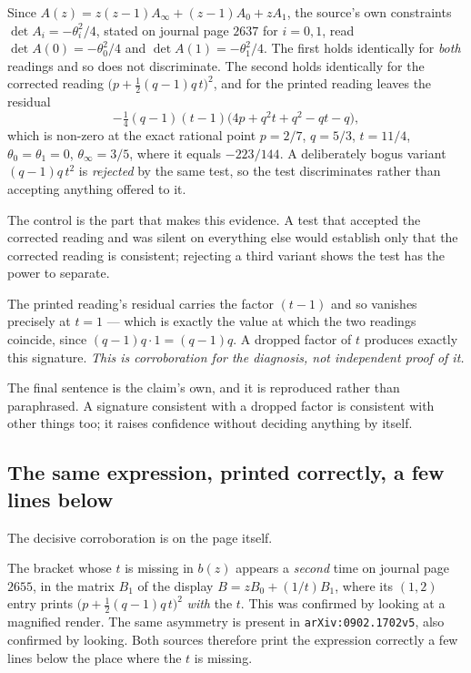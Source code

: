 \begin{remark}
Since $A(z)=z(z-1)A_\infty+(z-1)A_0+zA_1$, the source's own constraints
$\det A_i=-\theta_i^{2}/4$, stated on journal page $2637$ for $i=0,1$,
read $\det A(0)=-\theta_0^{2}/4$ and
$\det A(1)=-\theta_1^{2}/4$. The first holds identically for \emph{both}
readings and so does not discriminate. The second holds identically for the
corrected reading $\bigl(p+\tfrac12(q-1)q\,t\bigr)^{2}$, and for the printed
reading leaves the residual
\[
  -\tfrac14 (q-1)(t-1)\bigl(4p+q^{2}t+q^{2}-qt-q\bigr),
\]
which is non-zero at the exact rational point $p=2/7$, $q=5/3$, $t=11/4$,
$\theta_0=\theta_1=0$, $\theta_\infty=3/5$, where it equals $-223/144$. A
deliberately bogus variant $(q-1)q\,t^{2}$ is \emph{rejected} by the same test,
so the test discriminates rather than accepting anything offered to it.
\end{remark}

The control is the part that makes this evidence. A test that accepted the
corrected reading and was silent on everything else would establish only that
the corrected reading is consistent; rejecting a third variant shows the test
has the power to separate.

\begin{remark}
The printed reading's residual carries the factor $(t-1)$ and so vanishes
precisely at $t=1$ --- which is exactly the value at which the two readings
coincide, since $(q-1)q\cdot1=(q-1)q$. A dropped factor of $t$ produces exactly
this signature. \emph{This is corroboration for the diagnosis, not independent
proof of it.}
\end{remark}

The final sentence is the claim's own, and it is reproduced rather than
paraphrased. A signature consistent with a dropped factor is consistent with
other things too; it raises confidence without deciding anything by itself.

\subsection{The same expression, printed correctly, a few lines below}\label{ssec:typo-b1}

The decisive corroboration is on the page itself.

\begin{remark}
The bracket whose $t$ is missing in $b(z)$ appears a \emph{second} time on
journal page $2655$, in the matrix $B_1$ of the display $B=zB_0+(1/t)B_1$,
where its $(1,2)$ entry prints $\bigl(p+\tfrac12(q-1)q\,t\bigr)^{2}$ \emph{with}
the $t$. This was confirmed by looking at a magnified render. The same
asymmetry is present in \texttt{arXiv:0902.1702v5}, also confirmed by looking.
Both sources therefore print the expression correctly a few lines below the
place where the $t$ is missing.
\end{remark}

